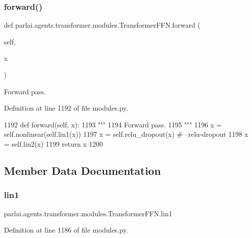 \subsubsection{\texorpdfstring{forward()}{forward()}}
{\footnotesize\ttfamily def parlai.\+agents.\+transformer.\+modules.\+Transformer\+F\+F\+N.\+forward (\begin{DoxyParamCaption}\item[{}]{self,  }\item[{}]{x }\end{DoxyParamCaption})}

\begin{DoxyVerb}Forward pass.
\end{DoxyVerb}
 

Definition at line 1192 of file modules.\+py.


\begin{DoxyCode}
1192     \textcolor{keyword}{def }forward(self, x):
1193         \textcolor{stringliteral}{"""}
1194 \textcolor{stringliteral}{        Forward pass.}
1195 \textcolor{stringliteral}{        """}
1196         x = self.nonlinear(self.lin1(x))
1197         x = self.relu\_dropout(x)  \textcolor{comment}{# --relu-dropout}
1198         x = self.lin2(x)
1199         \textcolor{keywordflow}{return} x
1200 \end{DoxyCode}


\subsection{Member Data Documentation}
\mbox{\label{classparlai_1_1agents_1_1transformer_1_1modules_1_1TransformerFFN_addc959c81b7c0ba87a47415af7f07e16}} 
\subsubsection{\texorpdfstring{lin1}{lin1}}
{\footnotesize\ttfamily parlai.\+agents.\+transformer.\+modules.\+Transformer\+F\+F\+N.\+lin1}



Definition at line 1186 of file modules.\+py.

